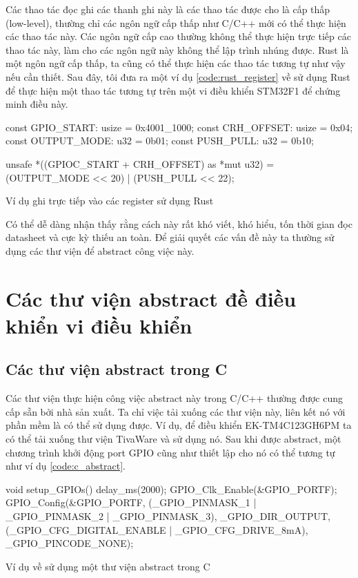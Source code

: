 Các thao tác đọc ghi các thanh ghi này là các thao tác được cho là cấp thấp (low-level), thường chỉ các ngôn ngữ cấp thấp như C/C++ mới có thể thực hiện các thao tác này.
Các ngôn ngữ cấp cao thường không thể thực hiện trực tiếp các thao tác này, làm cho các ngôn ngữ này không thể lập trình nhúng được.
Rust là một ngôn ngữ cấp thấp,  ta cũng có thể thực hiện các thao tác tương tự như vậy nếu cần thiết.
Sau đây, tôi đưa ra một ví dụ \ref{code:rust_register} về sử dụng Rust để thực hiện một thao tác tương tự trên một vi điều khiển STM32F1 để chứng minh điều này.
\begin{listing}[ht]
\begin{rustcode}
const GPIO_START: usize = 0x4001_1000;
const CRH_OFFSET: usize = 0x04;
const OUTPUT_MODE: u32 = 0b01;
const PUSH_PULL: u32 = 0b10;

unsafe {
    *((GPIOC_START + CRH_OFFSET) as *mut u32) = (OUTPUT_MODE << 20) | (PUSH_PULL << 22);
}
\end{rustcode}
\caption{Ví dụ ghi trực tiếp vào các register sử dụng Rust}
\label{code:rust_register}
\end{listing}

Có thể dễ dàng nhận thấy rằng cách này rất khó viết, khó hiểu, tốn thời gian đọc datasheet và cực kỳ thiếu an toàn.
Để giải quyết các vấn đề này ta thường sử dụng các thư viện để abstract công việc này.
\section{Các thư viện abstract đề điều khiển vi điều khiển}
\subsection{Các thư viện abstract trong C}
Các thư viện thực hiện công việc abstract này trong C/C++ thường được cung cấp sẵn bởi nhà sản xuất.
Ta chỉ việc tải xuống các thư viện này, liên kết nó với phần mềm là có thể sử dụng được.
Ví dụ, để điều khiển EK-TM4C123GH6PM ta có thể tải xuống thư viện TivaWare \cite{tivac_tivaware} và sử dụng nó.
Sau khi được abstract, một chương trình khởi động port GPIO cũng như thiết lập cho nó có thể tương tự như ví dụ \ref{code:c_abstract}.
\begin{listing}[ht]
\begin{ccode}
void setup_GPIOs()
{
     delay_ms(2000);
     GPIO_Clk_Enable(&GPIO_PORTF);
     GPIO_Config(&GPIO_PORTF,
                 (_GPIO_PINMASK_1 | _GPIO_PINMASK_2 | _GPIO_PINMASK_3),
                 _GPIO_DIR_OUTPUT,
                 (_GPIO_CFG_DIGITAL_ENABLE | _GPIO_CFG_DRIVE_8mA),
                 _GPIO_PINCODE_NONE);
}
\end{ccode}
\caption{Ví dụ về sử dụng một thư viện abstract trong C}
\label{code:c_abstract}
\end{listing}


